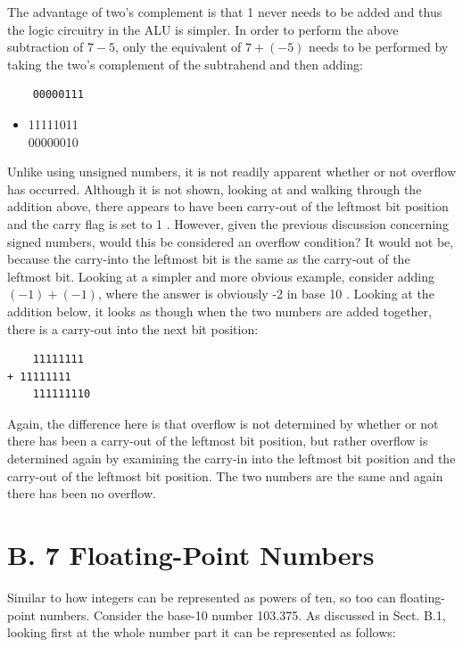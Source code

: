\documentclass[10pt]{book}
\begin{document}
\begin{center}
\begin{center}
\begin{center}
\begin{center}
\begin{center}
The advantage of two's complement is that 1 never needs to be added and thus the logic circuitry in the ALU is simpler. In order to perform the above subtraction of $7-5$, only the equivalent of $7+(-5)$ needs to be performed by taking the two's complement of the subtrahend and then adding:

\begin{verbatim}
    00000111
\end{verbatim}

\begin{itemize}
  \item 11111011\\
00000010
\end{itemize}

Unlike using unsigned numbers, it is not readily apparent whether or not overflow has occurred. Although it is not shown, looking at and walking through the addition above, there appears to have been carry-out of the leftmost bit position and the carry flag is set to 1 . However, given the previous discussion concerning signed numbers, would this be considered an overflow condition? It would not be, because the carry-into the leftmost bit is the same as the carry-out of the leftmost bit. Looking at a simpler and more obvious example, consider adding $(-1)+(-1)$, where the answer is obviously -2 in base 10 . Looking at the addition below, it looks as though when the two numbers are added together, there is a carry-out into the next bit position:

\begin{verbatim}
    11111111
+ 11111111
    111111110
\end{verbatim}

Again, the difference here is that overflow is not determined by whether or not there has been a carry-out of the leftmost bit position, but rather overflow is determined again by examining the carry-in into the leftmost bit position and the carry-out of the leftmost bit position. The two numbers are the same and again there has been no overflow.

\section*{B. 7 Floating-Point Numbers}
Similar to how integers can be represented as powers of ten, so too can floating-point numbers. Consider the base-10 number 103.375. As discussed in Sect. B.1, looking first at the whole number part it can be represented as follows:


\end{center}
\end{center}
\end{center}
\end{center}
\end{center}
\end{document}

